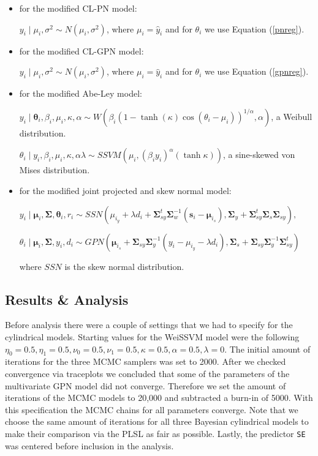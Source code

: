 \documentclass[11pt,]{article}
\begin{document}
\begin{itemize}
\item for the modified CL-PN model:

$y_i \mid \mu_i, \sigma^2 \sim N(\mu_i, \sigma^2)$, where $\mu_i = \hat{y}_i$ and for $\theta_i$ we use Equation (\ref{pnreg}).

\item for the modified CL-GPN model:

$y_i \mid \mu_i, \sigma^2 \sim N(\mu_i, \sigma^2)$, where $\mu_i = \hat{y}_i$ and for $\theta_i$ we use Equation (\ref{gpnreg}).

\item for the modified Abe-Ley model:

$y_i \mid \boldsymbol{\theta}_i, \beta_i, \mu_i, \kappa, \alpha \sim W\left(\beta_i(1-\tanh(\kappa)\cos(\theta_i - \mu_i))^{1/\alpha}, \alpha\right)$, a Weibull distribution.

$\theta_i \mid y_i, \beta_i, \mu_i, \kappa, \alpha \lambda \sim SSVM\left(\mu_i, (\beta_iy_i)^{\alpha}(\tanh{\kappa})\right)$, a sine-skewed von Mises distribution.

\item for the modified joint projected and skew normal model:

$y_i \mid \boldsymbol{\mu}_i, \boldsymbol{\Sigma}, \boldsymbol{\theta}_i, r_i \sim SSN(\mu_{i_y} + \lambda d_i + \boldsymbol{\Sigma}_{sy}^t\boldsymbol{\Sigma}_w^{-1}(\boldsymbol{s}_i - \boldsymbol{\mu}_{i_s}), \boldsymbol{\Sigma}_y + \boldsymbol{\Sigma}_{sy}^t\boldsymbol{\Sigma}_s\boldsymbol{\Sigma}_{sy}),$

$\theta_i \mid \boldsymbol{\mu}_i, \boldsymbol{\Sigma}, y_i, d_i \sim GPN(\boldsymbol{\mu}_{i_s} + \boldsymbol{\Sigma}_{sy}\boldsymbol{\Sigma}_y^{-1} (y_i - \mu_{i_y} - \lambda d_i), \boldsymbol{\Sigma}_s + \boldsymbol{\Sigma}_{sy}\boldsymbol{\Sigma}_y^{-1}\boldsymbol{\Sigma}_{sy}^t)$

where $SSN$ is the skew normal distribution.

\end{itemize}

\subsection{Results \& Analysis}\label{DataResults}

Before analysis there were a couple of settings that we had to specify
for the cylindrical models. Starting values for the WeiSSVM model were
the following
\(\eta_0 = 0.5, \eta_1 = 0.5, \nu_0 = 0.5, \nu_1 = 0.5, \kappa = 0.5, \alpha = 0.5, \lambda = 0\).
The initial amount of iterations for the three MCMC samplers was set to
2000. After we checked convergence via traceplots we concluded that some
of the parameters of the multivariate GPN model did not converge.
Therefore we set the amount of iterations of the MCMC models to 20,000
and subtracted a burn-in of 5000. With this specification the MCMC
chains for all parameters converge. Note that we choose the same amount
of iterations for all three Bayesian cylindrical models to make their
comparison via the PLSL as fair as possible. Lastly, the predictor
\verb|SE| was centered before inclusion in the analysis.
\end{document}
